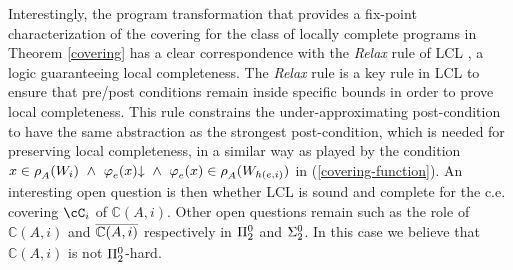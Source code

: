 \documentclass[runningheads]{llncs}
\def\ok#1{\mbox{\raisebox{0ex}[1ex][1ex]{$#1$}}}
\def\re{c.e.}
\def\bbbc{{\mathbb{C}}}
\newcommand{\pfunction}[3]{\ok{\varphi^{#2\, #3}_{#1}}}
\newcommand{\auco}[2]{\ok{\rho^{#1}_{#2}}}
\newcommand{\compl}[1]{\ok{\overline{#1}}}
\def\ok#1{\mbox{\raisebox{0ex}[1ex][1ex]{$#1$}}}
\def\cAA{\ensuremath{A}}
\begin{document}
Interestingly, the program transformation that provides a fix-point characterization of the covering for the class of locally complete programs in Theorem \ref{covering} has a clear correspondence with the {\em Relax\/} rule of LCL \cite{BruniGGR21}, a logic guaranteeing local completeness. The {\em Relax\/} rule is a key rule in LCL to ensure that pre/post conditions remain inside specific bounds in order to prove local completeness. This rule constrains the under-approximating post-condition to have the same abstraction as the strongest post-condition, which is needed for preserving local completeness, in a similar way as played by the condition $x\in \auco{}{A}(W_{i})~\wedge~\pfunction{e}{}{}(x){\downarrow}~\wedge~\pfunction{e}{}{}(x)\in \auco{}{A}(W_{h(e,i)})$ in (\ref{covering-function}).
An interesting open question is then whether LCL is sound and complete for the {\re} covering $\cC_i$ of $\bbbc(\cAA,i)$.
Other open questions remain such as the role of $\bbbc(\cAA,i)$ and $\compl{\bbbc(\cAA,i)}$ respectively in $\ok{\Pi^0_2}$ and $\ok{\Sigma^0_2}$. In this case we believe that $\bbbc(\cAA,i)$ is not $\ok{\Pi^0_2}$-hard.



\end{document}
